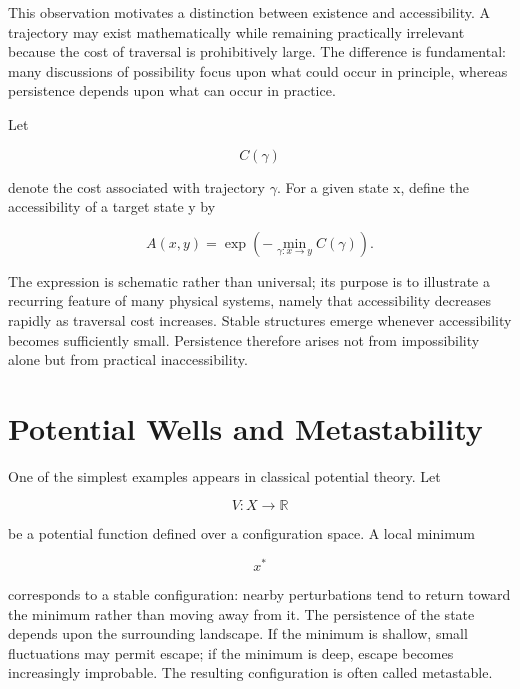 \documentclass[11pt,oneside]{book}
\theoremstyle{plain}
\theoremstyle{definition}
\theoremstyle{remark}
\begin{document}
This observation motivates a distinction between existence and accessibility. A trajectory may exist mathematically while remaining practically irrelevant because the cost of traversal is prohibitively large. The difference is fundamental: many discussions of possibility focus upon what could occur in principle, whereas persistence depends upon what can occur in practice.

Let

\begin{equation}
C(\gamma)
\end{equation}

denote the cost associated with trajectory \(\gamma\). For a given state x, define the accessibility of a target state y by

\begin{equation}
A(x,y)
=
\exp
\left(
-\min_{\gamma:x\rightarrow y}
C(\gamma)
\right).
\end{equation}

The expression is schematic rather than universal; its purpose is to illustrate a recurring feature of many physical systems, namely that accessibility decreases rapidly as traversal cost increases. Stable structures emerge whenever accessibility becomes sufficiently small. Persistence therefore arises not from impossibility alone but from practical inaccessibility.

\section{Potential Wells and Metastability}

One of the simplest examples appears in classical potential theory. Let

\begin{equation}
V : X
\rightarrow
\mathbb{R}
\end{equation}

be a potential function defined over a configuration space. A local minimum

\begin{equation}
x^\ast
\end{equation}

corresponds to a stable configuration: nearby perturbations tend to return toward the minimum rather than moving away from it. The persistence of the state depends upon the surrounding landscape. If the minimum is shallow, small fluctuations may permit escape; if the minimum is deep, escape becomes increasingly improbable. The resulting configuration is often called metastable.
\end{document}

